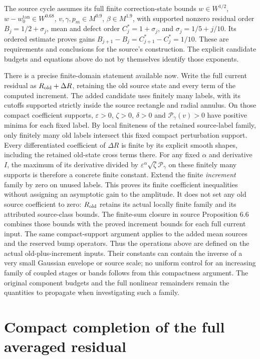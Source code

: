 \documentclass[11pt]{article}
\begin{document}
The source cycle assumes its full finite correction-state bounds
$w\in W^{1/2}$, $w-w_0^{\tan}\in W^{0.68}$,
$v,\gamma,p_m\in M^{0.9}$, $\beta\in M^{1.9}$,
with supported nonzero residual order
$B_j=1/2+\sigma_j$, mean and defect order $C_j^*=1+\sigma_j$,
and $\sigma_j=1/5+j/10$. Its ordered estimate proves gains
$B_{j+1}-B_j=C_{j+1}^*-C_j^*=1/10$.
These are requirements and conclusions for the source's construction.
The explicit candidate budgets and equations above do not by
themselves identify those exponents.

There is a precise finite-domain statement available now. Write the
full current residual as $R_{\rm old}+\Delta R$, retaining the old
source state and every term of the computed increment. The added
candidate uses finitely many labels, with its cutoffs supported
strictly inside the source rectangle and radial annulus. On those
compact coefficient supports, $\varepsilon>0$, $\zeta>0$,
$\delta>0$ and $\mathcal P_\gamma(v)>0$ have positive minima
for each fixed label. By local finiteness of the retained source-label
family, only finitely many old labels intersect this fixed compact
perturbation support. Every differentiated coefficient of $\Delta R$
is finite by its explicit smooth shapes, including the retained old-state
cross terms there. For any fixed
$\alpha$ and derivative $I$, the maximum of its derivative divided by
$\varepsilon^\alpha\sqrt\zeta\mathcal P_\gamma$ on these finitely
many supports is therefore a concrete finite constant. Extend the
finite \emph{increment} family by zero on unused labels. This proves its
finite coefficient inequalities without assigning an asymptotic gain
to the amplitude. It does not set any old source coefficient to zero:
$R_{\rm old}$ retains its actual locally finite family and its attributed
source-class bounds. The finite-sum closure in source Proposition 6.6
combines those bounds with the proved increment bounds for each full
current input. The same compact-support argument applies to the added
mean sources and the reserved bump operators. Thus the operations
above are defined on the actual old-plus-increment inputs.
Their constants can contain the inverse of a very small Gaussian
envelope or source scale; no uniform control for an increasing family
of coupled stages or bands follows from this compactness argument.
The original component budgets and the full nonlinear remainders
remain the quantities to propagate when investigating such a family.


\section{Compact completion of the full averaged residual}
\label{mcstress:section}
\end{document}
